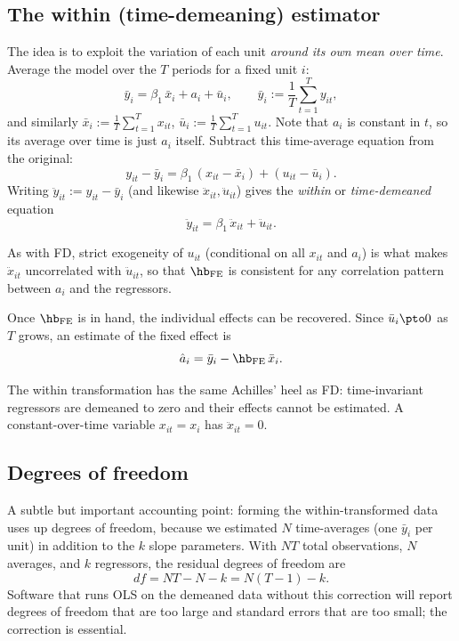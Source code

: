 \subsection{The within (time-demeaning) estimator}

The idea is to exploit the variation of each unit \emph{around its own mean over time}. Average the model over the $T$ periods for a fixed unit $i$:
\[
\bar y_i = \beta_1\,\bar x_i + a_i + \bar u_i,
\qquad
\bar y_i := \frac1T\sum_{t=1}^{T} y_{it},
\]
and similarly $\bar x_i := \frac1T\sum_{t=1}^T x_{it}$, $\bar u_i := \frac1T\sum_{t=1}^T u_{it}$. Note that $a_i$ is constant in $t$, so its average over time is just $a_i$ itself. Subtract this time-average equation from the original:
\[
y_{it} - \bar y_i = \beta_1\,(x_{it}-\bar x_i) + (u_{it}-\bar u_i).
\]
Writing $\ddot y_{it} := y_{it}-\bar y_i$ (and likewise $\ddot x_{it}, \ddot u_{it}$) gives the \emph{within} or \emph{time-demeaned} equation
\[
\ddot y_{it} = \beta_1\,\ddot x_{it} + \ddot u_{it}.
\]


As with FD, strict exogeneity of $u_{it}$ (conditional on all $x_{it}$ and $a_i$) is what makes $\ddot x_{it}$ uncorrelated with $\ddot u_{it}$, so that $\hb_{\text{FE}}$ is consistent for any correlation pattern between $a_i$ and the regressors.

Once $\hb_{\text{FE}}$ is in hand, the individual effects can be recovered. Since $\bar u_i \pto 0$ as $T$ grows, an estimate of the fixed effect is
\[
\hat a_i = \bar y_i - \hb_{\text{FE}}\,\bar x_i.
\]

The within transformation has the same Achilles' heel as FD: time-invariant regressors are demeaned to zero and their effects cannot be estimated. A constant-over-time variable $x_{it}=x_i$ has $\ddot x_{it}=0$.

\subsection{Degrees of freedom}

A subtle but important accounting point: forming the within-transformed data uses up degrees of freedom, because we estimated $N$ time-averages (one $\bar y_i$ per unit) in addition to the $k$ slope parameters. With $NT$ total observations, $N$ averages, and $k$ regressors, the residual degrees of freedom are
\[
df = NT - N - k = N(T-1) - k.
\]
Software that runs OLS on the demeaned data without this correction will report degrees of freedom that are too large and standard errors that are too small; the correction is essential.

